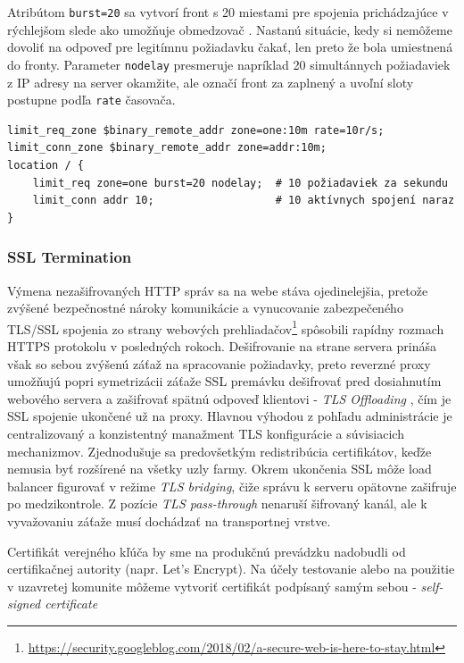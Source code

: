 \documentclass[12pt, a4paper]{article}
\begin{document}
Atribútom \verb|burst=20| sa vytvorí front s 20 miestami pre spojenia prichádzajúce v rýchlejšom slede ako 
umožňuje obmedzovač \cite{nginx-rate-limiting}. Nastanú situácie, kedy si nemôžeme dovoliť na odpoveď pre 
legitímnu požiadavku čakať, len preto že bola umiestnená do fronty. Parameter \verb|nodelay| presmeruje 
napríklad 20 simultánnych požiadaviek z IP adresy na server okamžite, ale označí front za zaplnený a uvoľní 
sloty postupne podľa \verb|rate| časovača.

\begin{lstlisting}
limit_req_zone $binary_remote_addr zone=one:10m rate=10r/s;
limit_conn_zone $binary_remote_addr zone=addr:10m;
location / { 
    limit_req zone=one burst=20 nodelay;  # 10 požiadaviek za sekundu
    limit_conn addr 10;                   # 10 aktívnych spojení naraz
}
\end{lstlisting}

\subsubsection{SSL Termination}
Výmena nezašifrovaných HTTP správ sa na webe stáva ojedinelejšia, pretože zvýšené bezpečnostné
nároky komunikácie a vynucovanie zabezpečeného TLS/SSL spojenia zo strany webových 
prehliadačov\footnote{\url{https://security.googleblog.com/2018/02/a-secure-web-is-here-to-stay.html}} 
spôsobili rapídny rozmach HTTPS protokolu v posledných rokoch. Dešifrovanie na strane servera prináša však 
so sebou zvýšenú záťaž na spracovanie požiadavky, preto reverzné proxy umožňujú popri symetrizácii záťaže
SSL premávku dešifrovať pred dosiahnutím webového servera a zašifrovať spätnú odpoveď klientovi - 
\emph{TLS Offloading} \cite{ssl-termination}, čím je SSL spojenie ukončené už na proxy. Hlavnou výhodou z 
pohľadu administrácie je centralizovaný a konzistentný manažment TLS konfigurácie a súvisiacich mechanizmov. 
Zjednodušuje sa predovšetkým redistribúcia certifikátov, keďže nemusia byť rozšírené na všetky uzly farmy. 
Okrem ukončenia SSL môže load balancer figurovať v režime \emph{TLS bridging}, čiže správu k serveru 
opätovne zašifruje po medzikontrole. Z pozície \emph{TLS pass-through} nenaruší šifrovaný kanál, ale k 
vyvažovaniu záťaže musí dochádzať na transportnej vrstve.

Certifikát verejného kľúča by sme na produkčnú prevádzku nadobudli od certifikačnej autority 
(napr. Let's Encrypt). Na účely testovanie alebo na použitie v uzavretej komunite môžeme vytvoriť
certifikát podpísaný samým sebou - \emph{self-signed certificate} 
\end{document}
